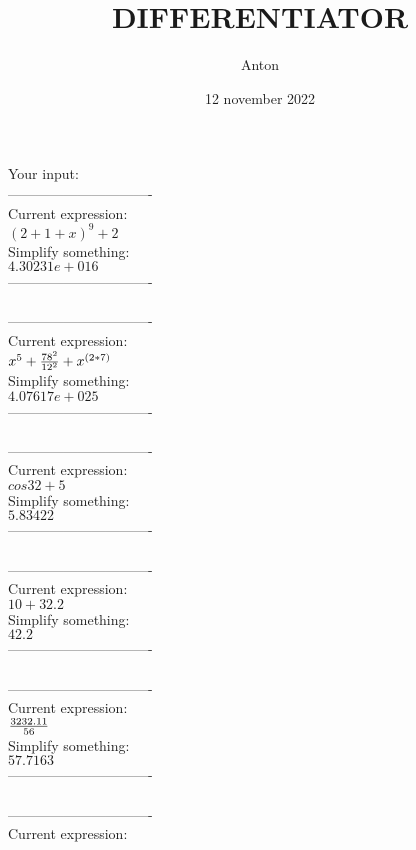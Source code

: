 \documentclass[12pt]{article}
\title{DIFFERENTIATOR}
\author{Anton}
\date{12 november 2022}
\begin{document}
    \maketitle
    Your input: \\
    
-------------------------------\\
Current expression:\\
\( {{(2+1+x)}^{9}}+2\) \\
Simplify something:\\
\( 4.30231e+016\) \\
-------------------------------\\
\\
-------------------------------\\
Current expression:\\
\( {{x}^{5}}+{{{{78}^{2}}}\over{{{12}^{2}}}}+{{x}^{(2*7)}}\) \\
Simplify something:\\
\( 4.07617e+025\) \\
-------------------------------\\
\\
-------------------------------\\
Current expression:\\
\( cos32+5\) \\
Simplify something:\\
\( 5.83422\) \\
-------------------------------\\
\\
-------------------------------\\
Current expression:\\
\( 10+32.2\) \\
Simplify something:\\
\( 42.2\) \\
-------------------------------\\
\\
-------------------------------\\
Current expression:\\
\( {{3232.11}\over{56}}\) \\
Simplify something:\\
\( 57.7163\) \\
-------------------------------\\
\\
-------------------------------\\
Current expression:\\
\end{document}
